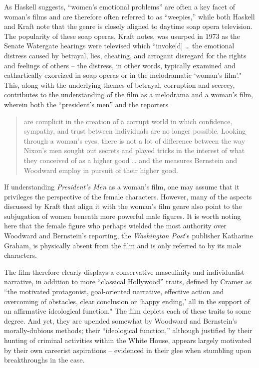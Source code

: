 As Haskell suggests, ``women’s emotional problems” are often a key facet of woman’s films and are therefore often referred to as ``weepies,” while both Haskell and Kraft note that the genre is closely aligned to daytime soap opera television.
The popularity of these soap operas, Kraft notes, was usurped in 1973 as the Senate Watergate hearings were televised which ``invoke[d] … the emotional distress caused by betrayal, lies, cheating, and arrogant disregard for the rights and feelings of others – the distress, in other words, typically examined and cathartically exorcized in soap operas or in the melodramatic `woman’s film’."\autocites[Kraft refers to several features and set pieces that place \textit{All the President's Men} ``in soap opera territory.” For example, the casting of Nicholas Coster, an actor known from the soap opera \textit{Another World}, as the lawyer Markham; the interaction between Markham and Bob Woodward as the lawyer plays dumb in response to the reporter’s questions (00:07:40); and the flirtatious interview Bernstein conducts with a potential source, Sharon Lyons (00:22:26).][31-34]{kraft_all_2008}
This, along with the underlying themes of betrayal, corruption and secrecy, contributes to the understanding of the film as a melodrama and a woman’s film, wherein both the ``president’s men” and the reporters 
\begin{quote}
are complicit in the creation of a corrupt world in which confidence, sympathy, and trust between individuals are no longer possible. Looking through a woman’s eyes, there is not a lot of difference between the way Nixon’s men sought out secrets and played tricks in the interest of what they conceived of as a higher good … and the measures Bernstein and Woodward employ in pursuit of their higher good.\autocites[][35]{kraft_all_2008}
\end{quote}
If understanding \textit{President’s Men} as a woman’s film, one may assume that it privileges the perspective of the female characters.
However, many of the aspects discussed by Kraft that align it with the woman’s film genre also point to the subjugation of women beneath more powerful male figures.
It is worth noting here that the female figure who perhaps wielded the most authority over Woodward and Bernstein’s reporting, the \textit{Washington Post}’s publisher Katharine Graham, is physically absent from the film and is only referred to by its male characters.

The film therefore clearly displays a conservative masculinity and individualist narrative, in addition to more ``classical Hollywood” traits, defined by Cramer as ``the motivated protagonist, goal-oriented narrative, effective action and overcoming of obstacles, clear conclusion or `happy ending,’ all in the support of an affirmative ideological function."\autocites[][180]{cramer_neoliberal_2022}
The film depicts each of these traits to some degree.
And yet, they are upended somewhat by Woodward and Bernstein’s morally-dubious methods; their ``ideological function,” although justified by their hunting of criminal activities within the White House, appears largely motivated by their own careerist aspirations – evidenced in their glee when stumbling upon breakthroughs in the case.

